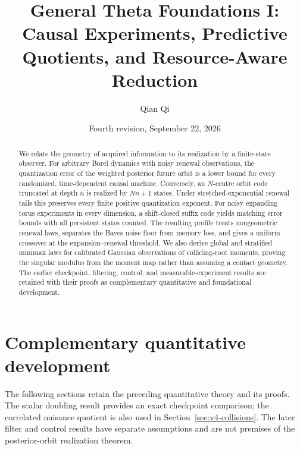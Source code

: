 
\title[General Theta Foundations I]{General Theta Foundations I: Causal Experiments, Predictive Quotients, and Resource-Aware Reduction}
\author{Qian Qi}
\date{Fourth revision, September 22, 2026}

\begin{abstract}
We relate the geometry of acquired information to its realization by a
finite-state observer. For arbitrary Borel dynamics with noisy renewal
observations, the quantization error of the weighted posterior future
orbit is a lower bound for every randomized, time-dependent causal
machine. Conversely, an $N$-centre orbit code truncated at depth $n$
is realized by $Nn+1$ states. Under stretched-exponential renewal tails
this preserves every finite positive quantization exponent. For noisy
expanding torus experiments in every dimension, a shift-closed suffix
code yields matching error bounds with all persistent states counted.
The resulting profile treats nongeometric renewal laws, separates the
Bayes noise floor from memory loss, and gives a uniform crossover at
the expansion--renewal threshold. We also derive global and stratified
minimax laws for calibrated Gaussian observations of colliding-root
moments, proving the singular modulus from the moment map rather than
assuming a contact geometry. The earlier checkpoint, filtering,
control, and measurable-experiment results are retained with their
proofs as complementary quantitative and foundational development.
\end{abstract}
\maketitle
\tableofcontents




\section*{Complementary quantitative development}
The following sections retain the preceding quantitative theory and its
proofs. The scalar doubling result provides an exact checkpoint comparison;
the correlated nuisance quotient is also used in
Section~\ref{sec:v4-collisions}. The later filter and control results
have separate assumptions and are not premises of the posterior-orbit
realization theorem.



\appendix
